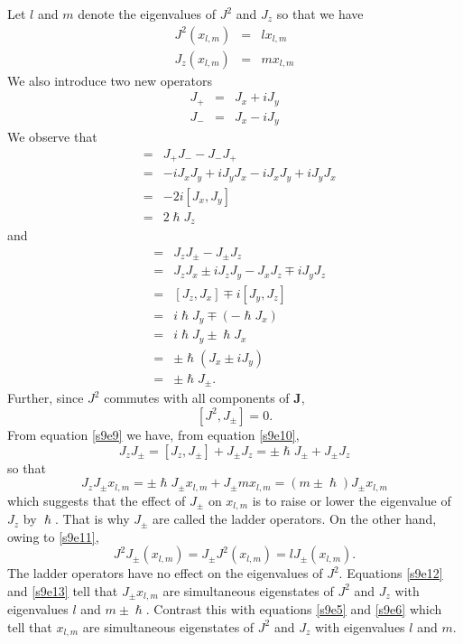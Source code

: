 \documentclass{article}
\numberwithin{equation}{section}
\let\vec\bm
\theoremstyle{plain}
\numberwithin{thm}{section}
\theoremstyle{plain}
\numberwithin{prop}{section}
\theoremstyle{definition}
\numberwithin{defn}{section}
\theoremstyle{remark}
\begin{document}
Let $l$ and $m$ denote the eigenvalues of $J^2$ and $J_z$ so that we have
\begin{eqnarray}
J^2(x_{l,m}) &=& l x_{l, m} \label{s9e5} \\
J_z(x_{l,m}) &=& m x_{l, m} \label{s9e6} 
\end{eqnarray}
We also introduce two new operators
\begin{eqnarray}
J_+ &=& J_x + iJ_y \label{s9e7} \\
J_- &=& J_x - iJ_y \label{s9e8}
\end{eqnarray}
We observe that
\begin{eqnarray}
[J_+, J_-] &=& J_+J_- - J_-J_+ \nonumber \\
 &=& -iJ_xJ_y + iJ_yJ_x -iJ_xJ_y + i J_yJ_x \nonumber \\
 &=& -2i[J_x, J_y] \nonumber \\
 &=& 2\hslash J_z \label{s9e9}
\end{eqnarray}
and 
\begin{eqnarray}
[J_z, J_\pm] &=& J_zJ_\pm - J_\pm J_z \nonumber \\
 &=& J_zJ_x \pm iJ_zJ_y - J_xJ_z \mp iJ_yJ_z \nonumber \\
 &=& [J_z, J_x] \mp i[J_y,J_z] \nonumber \\
 &=& i\hslash J_y \mp (-\hslash J_x) \nonumber \\
 &=& i\hslash J_y \pm \hslash J_x \nonumber \\
 &=& \pm\hslash(J_x \pm iJ_y)  \nonumber \\
 &=& \pm\hslash J_\pm. \label{s9e10}
\end{eqnarray}
Further, since $J^2$ commutes with all components of $\vec{J}$,
\begin{equation}\label{s9e11}
[J^2, J_\pm] = 0.
\end{equation}
From equation \eqref{s9e9} we have, from equation \eqref{s9e10},
\[
J_zJ_\pm = [J_z, J_\pm] + J_\pm J_z = \pm\hslash J_\pm + J_\pm J_z
\]
so that
\begin{equation}\label{s9e12}
J_zJ_\pm x_{l,m} = \pm\hslash J_\pm x_{l,m} + J_\pm mx_{l,m}
= (m \pm \hslash)J_\pm x_{l, m}
\end{equation}
which suggests that the effect of $J_\pm$ on $x_{l,m}$ is to raise or lower
the eigenvalue of $J_z$ by $\hslash$. That is why $J_\pm$ are called the ladder
operators. On the other hand, owing to \eqref{s9e11},
\begin{equation}\label{s9e13}
J^2J_\pm(x_{l,m}) = J_\pm J^2(x_{l,m}) = lJ_\pm(x_{l, m}).
\end{equation}
The ladder operators have no effect on the eigenvalues of $J^2$. Equations 
\eqref{s9e12} and \eqref{s9e13} tell that $J_\pm x_{l,m}$ are simultaneous
eigenstates of $J^2$ and $J_z$ with eigenvalues $l$ and $m \pm \hslash$. 
Contrast this with equations \eqref{s9e5} and \eqref{s9e6} which tell that
$x_{l,m}$ are simultaneous eigenstates of $J^2$ and $J_z$ with eigenvalues
$l$ and $m$.
\end{document}
